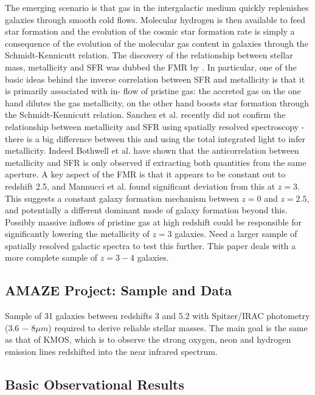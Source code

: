 \documentclass{literature}
\begin{document}
The emerging scenario is that gas in the intergalactic medium quickly replenishes galaxies through smooth cold flows. Molecular hydrogen is then available to feed star formation and the evolution of the cosmic star formation rate is simply a consequence of the evolution of the molecular gas content in galaxies through the Schmidt-Kennicutt relation. The discovery of the relationship between stellar mass, metallicity and SFR was dubbed the FMR by \citep{Mannucci2010}. In particular, one of the basic ideas behind the inverse correlation between SFR and metallicity is that it is primarily associated with in- flow of pristine gas: the accreted gas on the one hand dilutes the gas metallicity, on the other hand boosts star formation through the Schmidt-Kennicutt relation. Sanchez et al. \citep{Sanchez_2013} recently did not confirm the relationship between metallicity and SFR using spatially resolved spectroscopy - there is a big difference between this and using the total integrated light to infer metallicity. Indeed Bothwell et al. \citep{Bothwell2013} have shown that the anticorrelation between metallicity and SFR is only observed if extracting both quantities from the same aperture. A key aspect of the FMR is that it appears to be constant out to redshift 2.5, and Mannucci et al. \citep{Mannucci2010} found significant deviation from this at $z=3$. This suggests a constant galaxy formation mechanism between $z = 0$ and $z = 2.5$, and potentially a different dominant mode of galaxy formation beyond this. Possibly massive inflows of pristine gas at high redshift could be responsible for significantly lowering the metallicity of $z=3$ galaxies. Need a larger sample of spatially resolved galactic spectra to test this further. This paper deals with a more complete sample of $z = 3-4$ galaxies. \\ 
\subsection{AMAZE Project: Sample and Data}
Sample of 31 galaxies between redshifts 3 and 5.2 with Spitzer/IRAC photometry (3.6 − 8$\mu m$) required to derive reliable stellar masses. The main goal is the same as that of KMOS, which is to observe the strong oxygen, neon and hydrogen emission lines redshifted into the near infrared spectrum. 
\subsection{Basic Observational Results}
\end{document}
